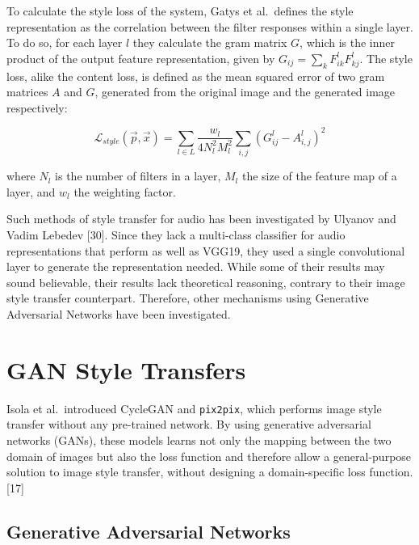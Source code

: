 \documentclass[12pt,a4paper,]{report}
\begin{document}
To calculate the style loss of the system, Gatys et al.~defines the
style representation as the correlation between the filter responses
within a single layer. To do so, for each layer \(l\) they calculate the
gram matrix \(G\), which is the inner product of the output feature
representation, given by \(G_{ij} = \sum_{k} F^l_{ik} F^l_{kj}\). The
style loss, alike the content loss, is defined as the mean squared error
of two gram matrices \(A\) and \(G\), generated from the original image
and the generated image respectively:

\begin{equation}
    \mathcal{L}_{style}(\vec{p}, \vec{x}) =  \sum_{l \in L} \frac{w_l}{4 N_l^2 M_l^2} \sum_{i, j} (G^l_{ij} - A^l_{i, j})^2
\end{equation}

where \(N_l\) is the number of filters in a layer, \(M_l\) the size of
the feature map of a layer, and \(w_l\) the weighting factor.

Such methods of style transfer for audio has been investigated by
Ulyanov and Vadim Lebedev {[}30{]}. Since they lack a multi-class
classifier for audio representations that perform as well as VGG19, they
used a single convolutional layer to generate the representation needed.
While some of their results may sound believable, their results lack
theoretical reasoning, contrary to their image style transfer
counterpart. Therefore, other mechanisms using Generative Adversarial
Networks have been investigated.

\hypertarget{gan-style-transfers}{%
\section{GAN Style Transfers}\label{gan-style-transfers}}

Isola et al.~introduced CycleGAN and \texttt{pix2pix}, which performs
image style transfer without any pre-trained network. By using
generative adversarial networks (GANs), these models learns not only the
mapping between the two domain of images but also the loss function and
therefore allow a general-purpose solution to image style transfer,
without designing a domain-specific loss function. {[}17{]}

\hypertarget{generative-adversarial-networks}{%
\subsection{Generative Adversarial
Networks}\label{generative-adversarial-networks}}
\end{document}
